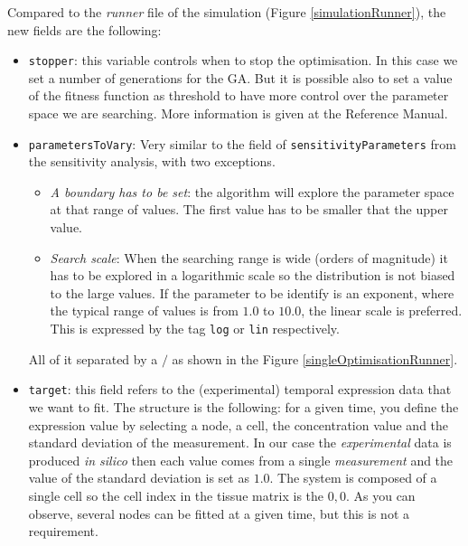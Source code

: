\documentclass[a4paper, 11pt]{article}
\begin{document}
  Compared to the \emph{runner} file of the simulation (Figure \ref{simulationRunner}), the new fields are the following:
  \begin{itemize}
  \item
    \texttt{stopper}: this variable controls when to stop the optimisation. 
    In this case we set a number of generations for the GA.
    But it is possible also to set a value of the fitness function as threshold to have more control over the parameter space we are searching. 
    More information is given at the Reference Manual.
  \item
    \texttt{parametersToVary}: Very similar to the field of \texttt{sensitivityParameters} from the sensitivity analysis, with two exceptions.
    \begin{itemize}
      \item
	\textit{A boundary has to be set}: the algorithm will explore the parameter space at that range of values.
	The first value has to be smaller that the upper value.
      \item
	\textit{Search scale}: When the searching range is wide (orders of magnitude) it has to be explored in a logarithmic scale so the distribution is not biased to the large values.
	If the parameter to be identify is an exponent, where the typical range of values is from $1.0$ to $10.0$, the linear scale is preferred.
	This is expressed by the tag \texttt{log} or \texttt{lin} respectively.
    \end{itemize}
    All of it separated by a $/$ as shown in the Figure \ref{singleOptimisationRunner}.
  \item
    \texttt{target}: this field refers to the (experimental) temporal expression data that we want to fit.
    The structure is the following: for a given time, you define the expression value by selecting a node, a cell, the concentration value and the standard deviation of the measurement. 
    In our case the \emph{experimental} data is produced \textit{in silico} then each value comes from a single \emph{measurement} and the value of the standard deviation is set as $1.0$.
    The system is composed of a single cell so the cell index in the tissue matrix is the $0,0$.
    As you can observe, several nodes can be fitted at a given time, but this is not a requirement.
  \end{itemize}
\end{document}
